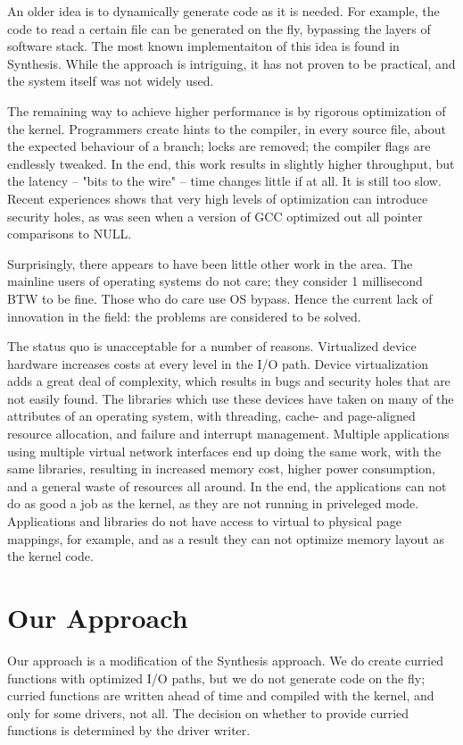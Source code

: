 \documentclass[letterpaper]{article}
\begin{document}
An older idea is to dynamically generate code as it is needed. For example, the code to read a certain file can 
be generated on the fly, bypassing the layers of software stack. The most known implementaiton of this idea 
is found in   Synthesis\cite{synthesis}. While the approach is intriguing, 
it has not proven to be practical, and the system itself was not widely used. 

The remaining way to achieve higher performance is by rigorous optimization of the kernel. Programmers
create hints to the compiler, in every source file, about the expected behaviour of a branch; locks are removed; 
the compiler flags are endlessly tweaked. In the end, this work results in slightly higher throughput, but the 
latency -- "bits to the wire" -- time changes little if at all. It is still too slow. Recent experiences shows that 
very high levels  
of optimization can introduce security holes, as was seen when a version of GCC 
optimized out all pointer comparisons to 
NULL. 

Surprisingly, there appears to have been little other work in the area. The mainline users of operating systems do not care; they consider 1 millisecond 
BTW to be fine. Those who do care use OS bypass. Hence the current lack of 
innovation in the field: the problems are considered to be solved. 

The status quo is unacceptable for a number of reasons. Virtualized device hardware increases costs at every level in the I/O path. Device
virtualization 
adds a great deal of complexity, which results in bugs and security holes that are not easily found. The libraries which use these 
devices have taken on many of the attributes of an operating system, with threading, cache- and page-aligned resource allocation, 
and failure and interrupt management. Multiple applications using multiple virtual network interfaces end up doing the same work, with the same
libraries, resulting in increased memory cost, higher power consumption, and a general waste of resources all around. In the end, the applications 
can not do as good a job as the kernel, as they are not running in priveleged mode. Applications and libraries do not have access to
virtual to physical page mappings, for example, and as a result they can not optimize memory layout as the kernel code. 

\section{Our Approach}
Our approach is a modification of the Synthesis approach. We do create curried functions with optimized I/O paths, 
but we do not generate code on the fly; curried functions are written ahead of time and compiled with the kernel, and only for some drivers, not all. The decision 
on whether to provide curried functions is determined by the driver writer. 
\end{document}
